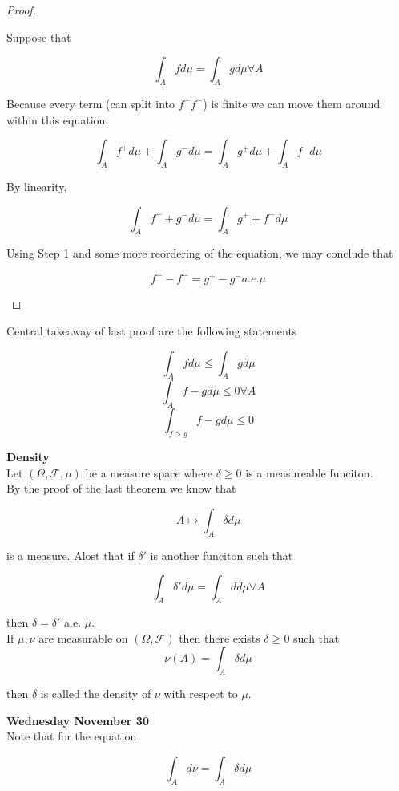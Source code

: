 \documentclass[11pt,fleqn]{book} %
\begin{document}
\begin{proof}
\begin{enumerate}
		Suppose that 

				$$\int_A f d\mu = \int_A g d\mu \forall A $$

		Because every term (can split into $f^+ f^-$) is finite we can move them around within this equation. 

				$$\int_A f^+ d\mu + \int_A g^- d\mu = \int_A g^+ d\mu + \int_A f^- d\mu $$

		By linearity, 

				$$ \int_A f^+ +  g^- d\mu = \int_A g^+ + f^- d\mu$$

		Using Step 1 and some more reordering of the equation, we may conclude that 

				$$f^+ - f^-  =  g^+ - g^-  a.e. \mu$$

	\end{enumerate}		 
\end{proof}

\begin{remark}
	Central takeaway of last proof are the following statements

			$$\int_A f d\mu \leq \int_A g d\mu $$
			$$ \int_A f - g d\mu \leq 0 \forall A$$
			$$ \int_{f > g} f - g d\mu \leq 0$$
\end{remark}

\textbf{Density}\\

Let $(\Omega, \mathcal{F}, \mu)$ be a measure space where $\delta \geq 0$ is a measureable funciton. \\

By the proof of the last theorem we know that

		$$A \mapsto \int_A \delta d\mu $$

is a measure. Alost that if $\delta'$ is another funciton such that 

		$$\int_A \delta' d\mu = \int_A d d\mu \forall A $$

then $\delta = \delta'$ a.e. $\mu$. \\

If $\mu, \nu$ are measurable on $(\Omega, \mathcal{F})$ then there exists $\delta \geq 0$ such that 
		$$\nu(A) = \int_A \delta d\mu $$

then $\delta$ is called the density of $\nu$ with respect to $\mu$.

\textbf{Wednesday November 30}\\

Note that for the equation

		$$\int_A d \nu = \int_A \delta d\mu  $$
\end{document}
